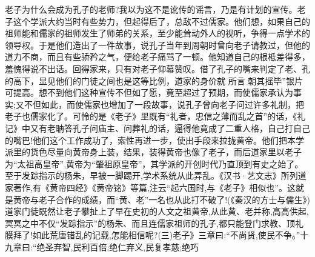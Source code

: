 \documentclass[a4paper,12pt,UTF8,twoside]{ctexbook}
\begin{document}
老子为什么会成为孔子的老师?我以为这不是讹传的谣言，乃是有计划的宣传。老子这个学派大约当时有些势力，但起得后了，总敌不过儒家。他们想，如果自己的祖师能和儒家的祖师发生了师弟的关系，至少能耸动外人的视听，争得一点学术的领导权。于是他们造出了一件故事，说孔子当年到周朝时曾向老子请教过，但他的道力不商，而且有些骄矜之气，便给老子痛骂了一顿。他知道自己的根柢差得多，羞愧得说不出话。回得家来，只有对老子仰幕赞叹。借了孔子的嘴来判定了老、孔的高下，显见他们的门徒之间也是这等比例，道家的身价就
所言
朝其摇毕”银片
可提高。想不到他们这种宣传不但如了愿，竟至超过了预期，而使儒家承认为事实;又不但如此，而使儒家也增加了一段故事，说孔子曾向老子问过许多礼制，把老子也儒家化了。可怜的是《老子》里既有“礼者，忠信之薄而乱之首”的话，《礼记》中又有老聃答孔子问庙主、问葬礼的话，逼得他竟成了二重人格，自己打自己的嘴巴!他们这个工作成功了，索性再进一步，使出手段来拉拢黄帝。他们把本学派里的货色尽量向黄帝身上装，结果，装得黄帝也像了老子，而后道家里以老子为“太祖高皇帝”,黄帝为“肇祖原皇帝”，其学派的开创时代乃直顶到有史之始了。至于发踪指示的杨朱，早被一脚踢开,学术系统从此弄乱。《汉书·艺文志》所列道家著作,有《黄帝四经》《黄帝铭》等篇,注云“起六国时,与《老子》相似也”。这就是黄帝与老子合作的成绩，而“黄、老”一名也从此打不破了!(《秦汉的方士与儒生》)
道家门徒既然让老子攀扯上了早在史初的人文之祖黄帝,从此黄、老并称,高高供起,冥冥之中不仅“发踪指示”的杨朱、而且连儒家祖师的孔子,都只能登门求教、顶礼膜拜了!如此荒唐错乱的记载,怎能相信呢?(三)老子》三章曰:“不尚贤,使民不争。”十九章曰:“绝圣弃智,民利百倍;绝仁弃义,民复孝慈;绝巧
\end{document}
